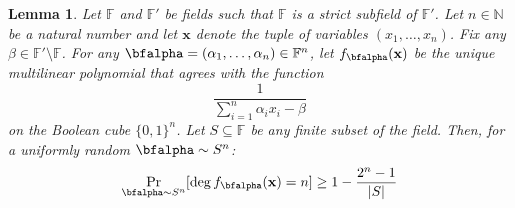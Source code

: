 \documentclass[11pt]{article}
\newtheorem{lemma}[theorem]{Lemma}
\newcommand{\Boo}{\{0,1 \}}
\newcommand{\F}{\mathbb{F}}
\begin{document}
\begin{lemma} \label{lem:basic degree lower bound}
    Let $\F$ and $\F'$ be fields such that $\F$ is a strict subfield of $\F'$. Let $n\in \mathbb{N}$ be a natural number and let $\mathbf{x}$ denote the tuple of variables $(x_1, \dots, x_n)$. Fix any $\beta \in \F'\setminus \F$. For any $\bfalpha = (\alpha_1, \dots, \alpha_n) \in \F^n$, let $f_{\bfalpha}(\mathbf{x})$ be the unique multilinear polynomial that agrees with the function $$\frac{1}{\sum_{i=1}^n{\alpha_ix_i}-\beta}$$ on the Boolean cube $\Boo^n$.
    Let $S \subseteq \F$ be any finite subset of the field.
    Then, for a uniformly random $\bfalpha \sim S^n$: $$\Pr_{\bfalpha \sim S^n}[\deg{f_{\bfalpha}(\mathbf{x})} = n] \geq 1 - \frac{2^n - 1}{|S|}$$
\end{lemma}
    
\end{document}
